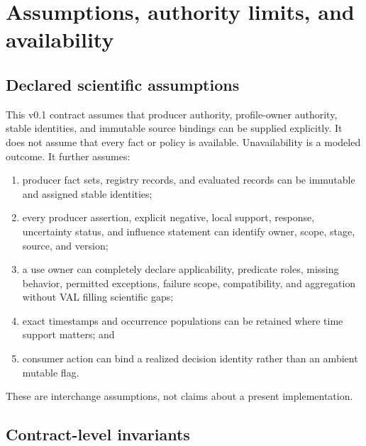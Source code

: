 \section{Assumptions, authority limits, and availability}
\label{sec:assumptions}

\subsection{Declared scientific assumptions}

This v0.1 contract assumes that producer authority, profile-owner authority,
stable identities, and immutable source bindings can be supplied explicitly.
It does not assume that every fact or policy is available. Unavailability is
a modeled outcome. It further assumes:
\begin{enumerate}
  \item producer fact sets, registry records, and evaluated records can be
        immutable and assigned stable identities;
  \item every producer assertion, explicit negative, local support, response,
        uncertainty status, and influence statement can identify owner,
        scope, stage, source, and version;
  \item a use owner can completely declare applicability, predicate roles,
        missing behavior, permitted exceptions, failure scope, compatibility,
        and aggregation without VAL filling scientific gaps;
  \item exact timestamps and occurrence populations can be retained where
        time support matters; and
  \item consumer action can bind a realized decision identity rather than an
        ambient mutable flag.
\end{enumerate}
These are interchange assumptions, not claims about a present implementation.

\subsection{Contract-level invariants}


